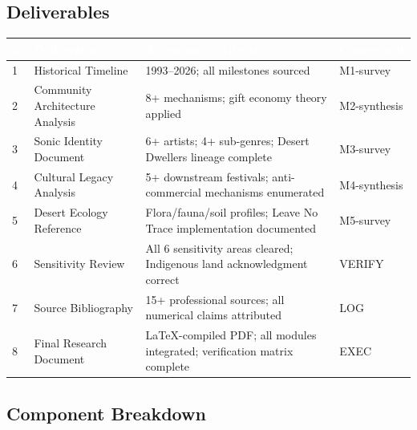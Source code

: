 \documentclass[11pt,letterpaper]{article}
\newcommand{\tableheader}[1]{\textbf{\sffamily\textcolor{white}{#1}}}
\begin{document}
\subsection{Deliverables}

\begin{center}
\begin{tabularx}{\textwidth}{C{0.5cm}L{3.5cm}XL{2.5cm}}
\toprule
{}
\tableheader{\#} & \tableheader{Deliverable} & \tableheader{Acceptance Criteria} & \tableheader{Component} \\
 & Historical Timeline & 1993--2026; all milestones sourced & M1-survey \\
2 & Community Architecture Analysis & 8+ mechanisms; gift economy theory applied & M2-synthesis \\
3 & Sonic Identity Document & 6+ artists; 4+ sub-genres; Desert Dwellers lineage complete & M3-survey \\
4 & Cultural Legacy Analysis & 5+ downstream festivals; anti-commercial mechanisms enumerated & M4-synthesis \\
5 & Desert Ecology Reference & Flora/fauna/soil profiles; Leave No Trace implementation documented & M5-survey \\
6 & Sensitivity Review & All 6 sensitivity areas cleared; Indigenous land acknowledgment correct & VERIFY \\
7 & Source Bibliography & 15+ professional sources; all numerical claims attributed & LOG \\
8 & Final Research Document & LaTeX-compiled PDF; all modules integrated; verification matrix complete & EXEC \\
\bottomrule
\end{tabularx}
\end{center}

\subsection{Component Breakdown}
\end{document}
